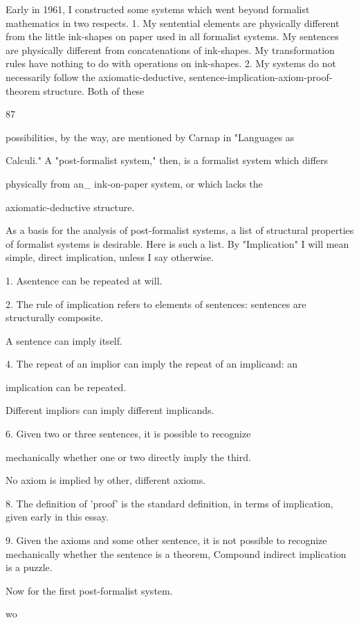 \documentclass[10pt,twoside]{memoir}
\begin{document}
\begin{enumerate}
{{{{{{{{{{{{{{{{Early in 1961, I constructed some systems which went beyond 
formalist mathematics in two respects. 1. My sentential elements are 
physically different from the little ink-shapes on paper used in all formalist 
systems. My sentences are physically different from concatenations of 
ink-shapes. My transformation rules have nothing to do with operations on 
ink-shapes. 2. My systems do not necessarily follow the axiomatic-deductive, 
sentence-implication-axiom-proof-theorem structure. Both of these 


87 


possibilities, by the way, are mentioned by Carnap in "Languages as 

Calculi." A "post-formalist system," then, is a formalist system which differs 

physically from  an_ ink-on-paper system, or which lacks the 

axiomatic-deductive structure. 

As a basis for the analysis of post-formalist systems, a list of structural 
properties of formalist systems is desirable. Here is such a list. By 
"Implication" I will mean simple, direct implication, unless I say otherwise. 

1. Asentence can be repeated at will. 

2. The rule of implication refers to elements of sentences: sentences 
are structurally composite. 

A sentence can imply itself. 

4. The repeat of an implior can imply the repeat of an implicand: an 

implication can be repeated. 

Different impliors can imply different implicands. 

6. Given two or three sentences, it is possible to recognize 

mechanically whether one or two directly imply the third. 

No axiom is implied by other, different axioms. 

8. The definition of 'proof' is the standard definition, in terms of 
implication, given early in this essay. 

9. Given the axioms and some other sentence, it is not possible to 
recognize mechanically whether the sentence is a theorem, 
Compound indirect implication is a puzzle. 

Now for the first post-formalist system. 


wo 


}}}}}}}}}}}}}}}}
\end{enumerate}
\end{document}
